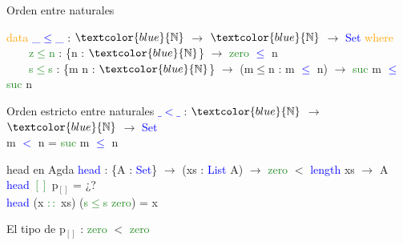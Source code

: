 \documentclass[xcolor=dvipsnames]{beamer} %
\newcommand{\cf}[1]{\textcolor{blue}{#1}}
\newcommand{\ct}[1]{\textcolor{blue}{#1}}
\newcommand{\cc}[1]{\textcolor{ForestGreen}{#1}}
\newcommand{\ck}[1]{\textcolor{orange}{#1}}
\newcommand{\N}{\ct{\mathbb{N}}}
\newcommand{\ra}{\rightarrow}
\begin{document}
\begin{frame}

\begin{block}{Orden entre naturales}

\ck{data} \ct{\_$\leq$\_} : $\N$ $\ra$ $\N$ $\ra$ \ct{Set} \ck{where}\\
\ \ \ \ \cc{z$\leq$n} : \{n : $\N$\}                 $\ra$ \cc{zero}  \ct{$\leq$} n\\
\ \ \ \ \cc{s$\leq$s} : \{m n : $\N$\} $\ra$ (m$\leq$n : m \ct{$\leq$} n) $\ra$ \cc{suc} m \ct{$\leq$} \cc{suc} n

\end{block}

\begin{block}{Orden estricto entre naturales}
\cf{$\_<\_$} : $\N$ $\ra$ $\N$ $\ra$ \ct{Set}\\
m \cf{$<$} n = \cc{suc} m \cf{$\leq$} n
\end{block}

\begin{block}{head en Agda}
    \cf{head} : \{A : \ct{Set}\}  $\ra$ (xs : \ct{List} A) $\ra$ 
    \cc{zero} $<$ \ct{length} xs $\rightarrow$ A \\
    \cf{head} \cc{$[]$} p$_{[]}$ = ¿?\\
    \cf{head} (x \cc{$::$} xs) (\cc{s$\leq$s} \cc{zero}) = x
  \end{block}  

\begin{block}{}
El tipo de p$_{[]}$ : \cc{zero} $<$ \cc{zero}
\end{block}

\end{frame}
\end{document}
